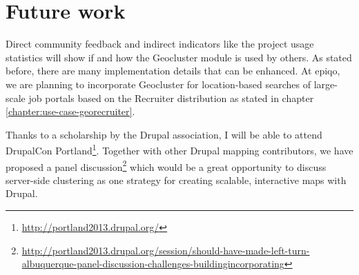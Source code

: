 \section{Future work}

Direct community feedback and indirect indicators like the project usage statistics will show if and how the Geocluster module is used by others. As stated before, there are many implementation details that can be enhanced. At epiqo, we are planning to incorporate Geocluster for location-based searches of large-scale job portals based on the Recruiter distribution as stated in chapter \ref{chapter:use-case-georecruiter}. 

Thanks to a scholarship by the Drupal association, I will be able to attend DrupalCon Portland\footnote{\url{http://portland2013.drupal.org/}}. Together with other Drupal mapping contributors, we have proposed a panel discussion\footnote{\url{http://portland2013.drupal.org/session/should-have-made-left-turn-albuquerque-panel-discussion-challenges-buildingincorporating}} which would be a great opportunity to discuss server-side clustering as one strategy for creating scalable, interactive maps with Drupal.

